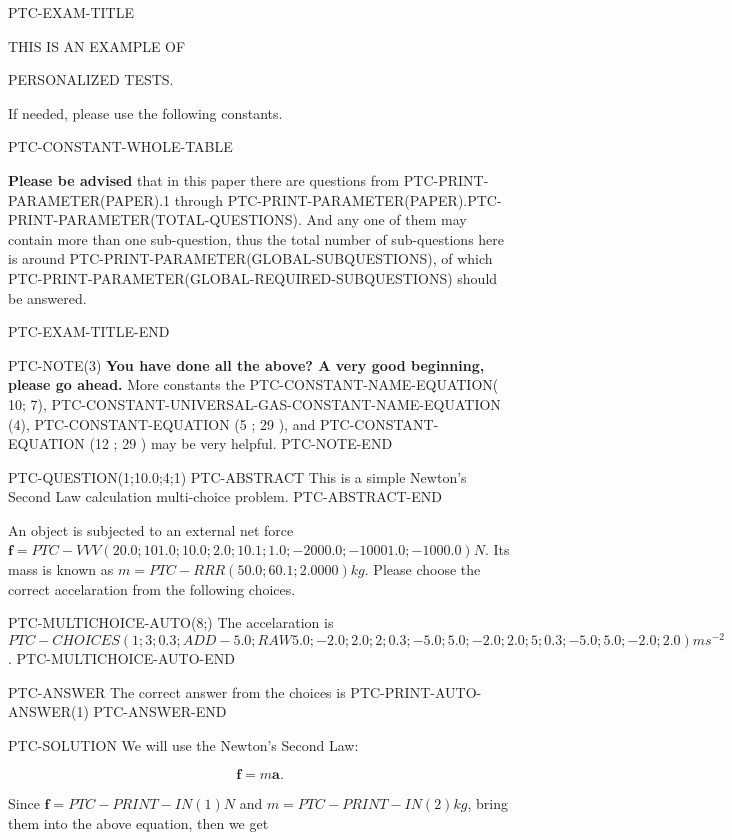 \documentclass[12pt]{article}
\begin{document}
PTC-EXAM-TITLE


{\Huge  THIS IS AN EXAMPLE OF}

{\Huge  PERSONALIZED TESTS. }

If needed, please use the following constants.

PTC-CONSTANT-WHOLE-TABLE

{\textbf{\large{Please be advised}}} that in this paper there are questions from
PTC-PRINT-PARAMETER(PAPER).1 through
PTC-PRINT-PARAMETER(PAPER).PTC-PRINT-PARAMETER(TOTAL-QUESTIONS).
And any one of them may contain more than one sub-question, thus the total number
of sub-questions here is around PTC-PRINT-PARAMETER(GLOBAL-SUBQUESTIONS), of which
PTC-PRINT-PARAMETER(GLOBAL-REQUIRED-SUBQUESTIONS) should be answered.

\vspace{0.3in}


PTC-EXAM-TITLE-END


PTC-NOTE(3)
\vspace{0.3in}
{\textbf{\LARGE{You have done all the above? A very good beginning, please go ahead.}}}
More constants the
PTC-CONSTANT-NAME-EQUATION( 10; 7),
PTC-CONSTANT-UNIVERSAL-GAS-CONSTANT-NAME-EQUATION (4),
PTC-CONSTANT-EQUATION (5 ; 29              ), and
PTC-CONSTANT-EQUATION (12 ; 29             )
may be very helpful.
\vspace{0.3in}
PTC-NOTE-END


PTC-QUESTION(1;10.0;4;1)
PTC-ABSTRACT
  This is a simple Newton's Second Law calculation multi-choice problem.
PTC-ABSTRACT-END

An object is subjected to an external net force $\mathbf{f}=
PTC-VVV (20.0; 101.0; 10.0; 2.0; 10.1; 1.0;-2000.0; -10001.0; -1000.0)N$.
Its mass is known as $m=PTC-RRR (50.0; 60.1; 2.0000) kg$. Please choose the
correct accelaration from the following choices.

PTC-MULTICHOICE-AUTO(8;)
The accelaration is $ PTC-CHOICES (1;
  3;0.3; ADD -5.0; RAW 5.0; -2.0; 2.0;
  2;0.3;-5.0; 5.0; -2.0; 2.0;
  5;0.3;-5.0; 5.0; -2.0; 2.0)ms^{-2} $.
PTC-MULTICHOICE-AUTO-END

PTC-ANSWER
The correct answer from the choices is
   PTC-PRINT-AUTO-ANSWER(1)
PTC-ANSWER-END

PTC-SOLUTION
We will use the Newton's Second Law:

\[
\mathbf{f}=m\mathbf{a}.
\]

Since $\mathbf{f}=PTC-PRINT-IN(1)N$
and $m=PTC-PRINT-IN(2)kg$, bring them into the above equation, then we get
\end{document}
